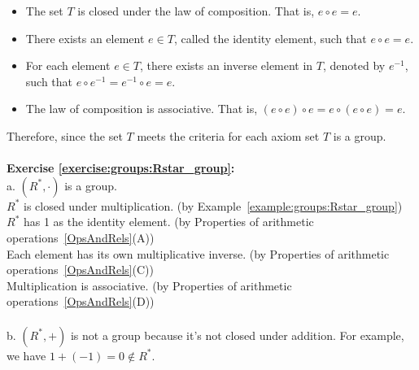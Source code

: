 \begin{itemize}
\item
The set $T$ is closed under the law of composition.  That is, 
$e \circ e = e$.
\\
\item
There exists an element $e \in T$, called the identity element, such that 
$e \circ e = e$.
\\
\item
For each element $e \in T$, there exists an inverse element in $T$, denoted by $e^{-1}$, such that 
$e \circ e^{-1} = e^{-1} \circ e = e$.
\\
\item
The law of composition is associative. That is, 
$(e \circ e) \circ e = e \circ (e \circ e) = e$.
\end{itemize}

Therefore, since the set $T$ meets the criteria for each axiom set $T$ is a group.
\\
\\
\noindent\textbf{Exercise \ref{exercise:groups:Rstar_group}:}\\
a. $(R^*, \cdot)$ is a group.\\
$R^*$ is closed under multiplication. (by Example~\ref{example:groups:Rstar_group}) \\
$R^*$ has 1 as the identity element. (by Properties of arithmetic operations~\ref{OpsAndRels}(A))\\
Each element has its own multiplicative inverse. (by  Properties of arithmetic operations~\ref{OpsAndRels}(C))\\
Multiplication is associative. (by Properties of arithmetic operations~\ref{OpsAndRels}(D))\\
\\
b. $(R^*,+)$ is not a group because it's not closed under addition. For example, we have $1+(-1)=0\not\in R^*$.\\
\\

